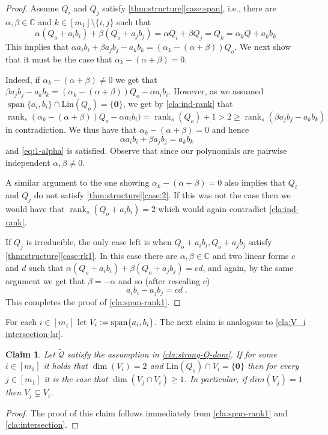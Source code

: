 \documentclass[10pt,a4paper]{article}
\newtheorem{claim}[theorem]{Claim}
\def\rank{\operatorname{rank}}
\newcommand{\eqdef}{\vcentcolon=}
\renewcommand{\vec}[1]{{\mathbf{#1}}}
\renewcommand{\C}{\mathbb{C}}
\newcommand{\cQ}{{\mathcal{Q}}}
\newcommand{\spn}[1]{\operatorname{span}\{{#1}\}}
\newcommand{\MS}{\text{Lin}}
\begin{document}
\begin{proof}
Assume $Q_i$ and $Q_j$ satisfy \autoref{thm:structure}\ref{case:span}, i.e., there are $\alpha, \beta \in \C$ and $k \in [m_1]\setminus \{i,j\}$ such that 
$$\alpha (Q_o+a_ib_i) + \beta ( Q_o+a_jb_j) = \alpha Q_i + \beta Q_j = Q_k =\alpha_kQ+a_kb_k \;$$ 
This implies that $\alpha a_ib_i + \beta a_jb_j -a_kb_k = (\alpha_k-(\alpha+\beta))Q_o$.
We next show that it must be the case that $\alpha_k-(\alpha+\beta) = 0$. 

Indeed, if $\alpha_k-(\alpha+\beta)\neq 0$ we get that $\beta a_jb_j -a_kb_k = (\alpha_k-(\alpha+\beta))Q_o- \alpha a_ib_i$. However,  as we assumed 
$\spn{a_i,b_i} \cap \MS(Q_o) = \{\vec{0}\}$, we get by  \autoref{cla:ind-rank} that 
$$\rank_s(\alpha_k-(\alpha+\beta))Q_o- \alpha a_ib_i)= \rank_s(Q_o)+1 > 2 \geq \rank_s(\beta a_jb_j -a_kb_k)$$ in contradiction.
We thus have that $\alpha_k-(\alpha+\beta) = 0$ and hence
\begin{equation} \label{eq:span-ak}
 \alpha a_ib_i + \beta a_jb_j = a_kb_k
\end{equation}
and \autoref{eq:1-alpha} is satisfied. Observe that since our polynomials are pairwise independent $\alpha, \beta\neq 0$.

A similar argument to the one showing $\alpha_k-(\alpha+\beta) = 0$ also implies that  $Q_i$ and $Q_j$ do not satisfy \autoref{thm:structure}\ref{case:2}. If this was not the case then we would have that $\rank_s(Q_o+a_ib_i)= 2$ which would again contradict  \autoref{cla:ind-rank}.

If $Q_j$ is irreducible, the only case left is when $Q_o+a_ib_i, Q_o+a_jb_j$ satisfy  \autoref{thm:structure}\ref{case:rk1}. In this case there are $\alpha, \beta \in \C$ and two linear forms $c$ and $d$ such that $ \alpha (Q_o+a_ib_i) + \beta ( Q_o+a_jb_j) = cd$, and again, by the same argument we get that  $\beta = -\alpha$ and so (after rescaling $c$)
\begin{equation*}
  a_ib_i -a_jb_j = cd \;. 
\end{equation*}
This completes the proof of \autoref{cla:span-rank1}.
\end{proof}

For each $i\in [m_1]$ let $V_i \eqdef \spn{a_i,b_i}$. 
The next claim is analogous to \autoref{cla:V_i intersection-hr}.
 
 \begin{claim}\label{cla:V_i intersection}
Let $\tilde\cQ$ satisfy the assumption in \autoref{cla:strong-Q-dom}. If for some $i\in [m_1]$ it holds that $\dim(V_i)=2$ and $\MS(Q_o)\cap V_i = \{\vec{0}\}$ then for every $j \in [m_1]$ it is the case that $\dim(V_j\cap V_i) \geq 1$. In particular, if $dim(V_j)=1$ then $V_j\varsubsetneq V_i$.
\end{claim}
\begin{proof}
The proof of this claim follows immediately from \autoref{cla:span-rank1} and \autoref{cla:intersection}.
\end{proof}
\end{document}
